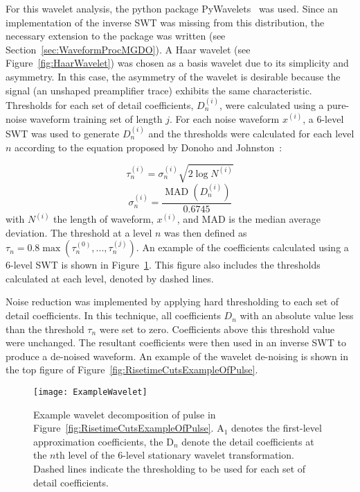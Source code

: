 	For this wavelet analysis, the python package PyWavelets~\cite{PyWave} was
used.  Since an implementation of the inverse SWT was missing from this
distribution, the necessary extension to the package was written (see
Section~\ref{sec:WaveformProcMGDO}).  A Haar wavelet (see Figure~\ref{fig:HaarWavelet}) was chosen as a basis
wavelet due to its simplicity and asymmetry.  In this case, the asymmetry of
the wavelet is desirable because the signal (an unshaped preamplifier trace)
exhibits the same characteristic.  Thresholds for each set of detail
coefficients, $D_{n}^{(i)}$, were calculated using a pure-noise waveform
training set of length $j$.  For each noise waveform $x^{(i)}$, a 6-level SWT
was used to generate $D_{n}^{(i)}$ and the thresholds were calculated for each
level $n$ according to the equation proposed by Donoho and
Johnston~\cite{Don95ad}:
	
				\begin{equation}			
					\tau_{n}^{(i)} = \sigma_{n}^{(i)} \sqrt{2 \log N^{(i)}}
				\end{equation}			
				\[
					\sigma_{n}^{(i)} = \frac{\operatorname{MAD}\left(D_{n}^{(i)}\right)}{0.6745}
				\]
with $N^{(i)}$ the length of waveform, $x^{(i)}$, and MAD is the median average deviation.  The threshold at a level $n$ was then defined as $\tau_{n} = 0.8 \max(\tau_{n}^{(0)},...,\tau_{n}^{(j)})$.  An example of the coefficients calculated using a 6-level SWT is shown in Figure~\ref{fig:RisetimeCutsWaveletDecompositionOfPulse}.  This figure also includes the thresholds calculated at each level, denoted by dashed lines.  

Noise reduction was implemented by applying hard thresholding to each set of detail coefficients.  In this technique, all coefficients $D_{n}$ with an absolute value less than the threshold $\tau_{n}$ were set to zero.  Coefficients above this threshold value were unchanged.  The resultant coefficients were then used in an inverse SWT to produce a de-noised waveform.  An example of the wavelet de-noising is shown in the top figure of Figure~\ref{fig:RisetimeCutsExampleOfPulse}.
	
			
				\begin{figure}
					\centering
					\texttt{[image: ExampleWavelet]}
					\caption[Example wavelet decomposition of pulse]
					{Example wavelet decomposition of pulse in Figure~\ref{fig:RisetimeCutsExampleOfPulse}.  
					A$_{1}$ denotes the first-level
					 approximation coefficients, the D$_{n}$ denote the detail coefficients at the $n$th level of the 6-level stationary wavelet 
					 transformation.  Dashed lines indicate the thresholding to be used for each set of detail coefficients.}
					\label{fig:RisetimeCutsWaveletDecompositionOfPulse}
				\end{figure}					

